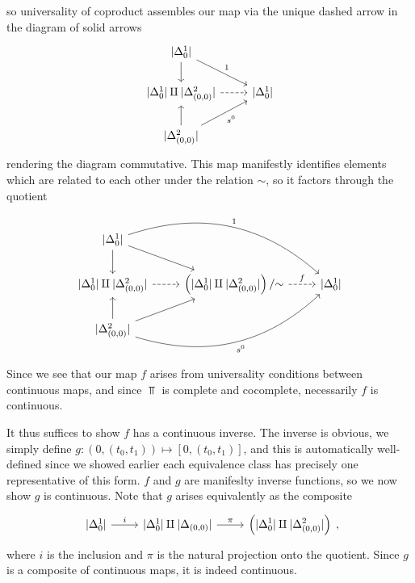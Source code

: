 \begin{example}
\begin{itemize}
    \end{itemize}
    so universality of coproduct assembles our map via the unique dashed arrow in the diagram of solid arrows
    \[\begin{tikzcd}
	{|\Delta_0^1|} \\
	{|\Delta_0^1|\amalg|\Delta_{(0,0)}^2|} & {|\Delta_0^1|} \\
	{|\Delta_{(0,0)}^2|}
	\arrow[from=1-1, to=2-1]
	\arrow["1", from=1-1, to=2-2]
	\arrow[dashed, from=2-1, to=2-2]
	\arrow[from=3-1, to=2-1]
	\arrow["{s^0}"', from=3-1, to=2-2]
\end{tikzcd}\]
    rendering the diagram commutative. This map manifestly identifies elements which are related to each other under the relation $\sim$, so it factors through the quotient
    \[\begin{tikzcd}
	{|\Delta_0^1|} \\
	{|\Delta_0^1|\amalg|\Delta_{(0,0)}^2|} & {\left(|\Delta_0^1|\amalg|\Delta_{(0,0)}^2|\right)/\tildesim} & {|\Delta_0^1|} \\
	{|\Delta_{(0,0)}^2|}
	\arrow[from=1-1, to=2-1]
	\arrow[from=1-1, to=2-2]
	\arrow["1", bend left, from=1-1, to=2-3]
	\arrow[dashed, from=2-1, to=2-2]
	\arrow["f", dashed, from=2-2, to=2-3]
	\arrow[from=3-1, to=2-1]
	\arrow[from=3-1, to=2-2]
	\arrow["{s^0}"', bend right, from=3-1, to=2-3]
\end{tikzcd}\]
    Since we see that our map $f$ arises from universality conditions between continuous maps, and since $\Top$ is complete and cocomplete, necessarily $f$ is continuous.

    It thus suffices to show $f$ has a continuous inverse. The inverse is obvious, we simply define $g : (0,(t_0,t_1))\mapsto [0,(t_0,t_1)]$, and this is automatically well-defined since we showed earlier each equivalence class has precisely one representative of this form. $f$ and $g$ are manifeslty inverse functions, so we now show $g$ is continuous. Note that $g$ arises equivalently as the composite
    \[\begin{tikzcd}
        {|\Delta_0^1|}\ar["i",r] & {|\Delta^1_0|\amalg|\Delta_{(0,0)}|}\ar["\pi",r] & \displaystyle{\left(|\Delta_0^1|\amalg|\Delta_{(0,0)}^2|\right)}
    \end{tikzcd},
    \]
    where $i$ is the inclusion and $\pi$ is the natural projection onto the quotient. Since $g$ is a composite of continuous maps, it is indeed continuous.


\end{example}
